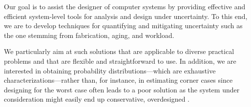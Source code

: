 Our goal is to assist the designer of computer systems by providing effective
and efficient system-level tools for analysis and design under uncertainty. To
this end, we are to develop techniques for quantifying and mitigating
uncertainty such as the one stemming from fabrication, aging, and workload.

We particularly aim at such solutions that are applicable to diverse practical
problems and that are flexible and straightforward to use. In addition, we are
interested in obtaining probability distributions---which are exhaustive
characterizations---rather than, for instance, in estimating corner cases since
designing for the worst case often leads to a poor solution as the system under
consideration might easily end up conservative, overdesigned \cite{quinton2012}.
